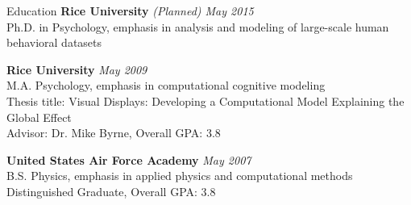  
\begin{rSection}{Education}
  {\bf Rice University} \hfill {\em (Planned) May 2015} \\
  Ph.D. in Psychology, emphasis in analysis and modeling of large-scale human behavioral datasets
\item {\bf Rice University} \hfill {\em May 2009} \\ 
  M.A. Psychology, emphasis in computational cognitive modeling \\
  Thesis title: Visual Displays: Developing a Computational Model Explaining the Global Effect \\
  Advisor: Dr. Mike Byrne, Overall GPA: 3.8
\item {\bf United States Air Force Academy} \hfill {\em May 2007} \\ 
  B.S. Physics, emphasis in applied physics and computational methods \\
  Distinguished Graduate, Overall GPA: 3.8 
\end{rSection}

